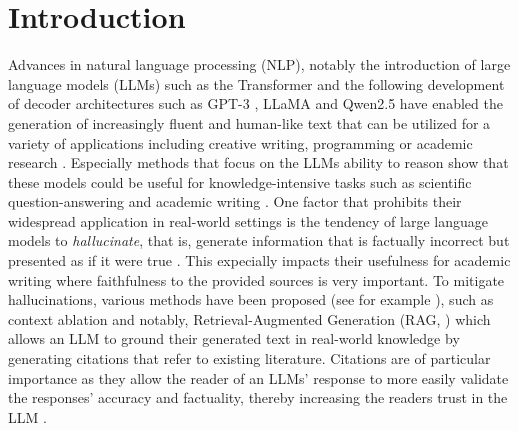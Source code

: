 \chapter{Introduction}\label{introduction}
Advances in natural language processing (NLP), notably the introduction of large language models (LLMs) such as the Transformer \cite{vaswani2017attention} and the following development of decoder architectures such as GPT-3 \cite{brown2020language}, LLaMA \cite{touvron2023llama} and Qwen2.5 \cite{an2024qwen2} have enabled the generation of increasingly fluent and human-like text that can be utilized for a variety of applications including creative writing, programming or academic research \cite{tonmoy2024comprehensive}. Especially methods that focus on the LLMs ability to reason \cite{guo2025deepseek,shao2025reasonir} show that these models could be useful for knowledge-intensive tasks such as scientific question-answering \cite{lala2023paperqa,xia2024ground} and academic writing \cite{asai2024openscholar,wang2025scholarcopilot}. One factor that prohibits their widespread application in real-world settings is the tendency of large language models to \emph{hallucinate}, that is, generate information that is factually incorrect but presented as if it were true \cite{do2024facilitating}. This expecially impacts their usefulness for academic writing where faithfulness to the provided sources is very important. To mitigate hallucinations, various methods have been proposed (see for example \cite{tonmoy2024comprehensive}), such as context ablation \cite{cohen2024contextcite,chuang2025selfcite} and notably, Retrieval-Augmented Generation (RAG, \cite{lewis2020retrieval}) which allows an LLM to ground their generated text in real-world knowledge by generating citations that refer to existing literature. Citations are of particular importance as they allow the reader of an LLMs' response to more easily validate the responses' accuracy and factuality, thereby increasing the readers trust in the LLM \cite{do2024facilitating}. 

